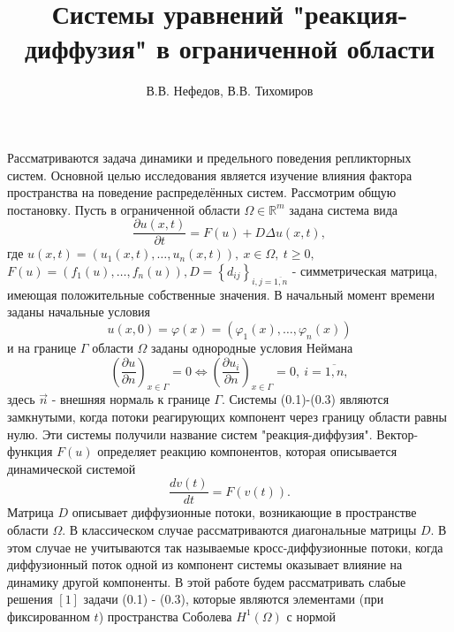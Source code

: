 \documentclass[9pt, a4paper]{extarticle}
\title{Системы уравнений "реакция-диффузия" в ограниченной области}
\author{В.В. Нефедов, В.В. Тихомиров}
\numberwithin{equation}{section}
\numberwithin{lemma}{section}
\numberwithin{definition}{section}
\numberwithin{notabene}{section}
\numberwithin{corollary}{section}
\begin{document}
	\maketitle
	Рассматриваются задача динамики и предельного поведения репликторных систем. Основной целью исследования является изучение влияния фактора пространства на поведение распределённых систем. Рассмотрим общую постановку.\newline
	Пусть в ограниченной области $\Omega \in \mathbb{R}^m$ задана система вида
	\begin{equation}
		\dfrac{\partial u(x,t)}{\partial t} = F(u) + D \Delta u(x,t),
	\end{equation}
	где $u(x,t) = \left(u_1(x,t), \dots, u_n(x,t)\right),\ x \in \Omega, \ t \geq 0,$ \newline $ F(u) = \left(f_1(u), \dots, f_n(u)\right),$\newline $D = \left\{d_{ij}\right\}_{i,j=\overline{1,n}}$ - симметрическая матрица, имеющая положительные собственные значения. \newline
	В начальный момент времени заданы начальные условия
	\begin{equation}
		u(x,0) = \varphi(x) = \left(\varphi_1(x), \dots, \varphi_n(x)\right)
	\end{equation}
	и на границе $\Gamma$ области $\Omega$ заданы однородные условия Неймана
	\begin{equation}
		\left(\dfrac{\partial u}{\partial n}\right)_{x \in \Gamma} = 0 \Leftrightarrow \left(\dfrac{\partial u_i}{\partial n}\right)_{x \in \Gamma} = 0, \ i = \overline{1,n},
	\end{equation}
	здесь $\vec{n}$ -  внешняя нормаль к границе $\Gamma$.\newline
	Системы (0.1)-(0.3) являются замкнутыми, когда потоки реагирующих компонент через границу области равны нулю. Эти системы получили название систем "реакция-диффузия". Вектор-функция $F(u)$ определяет реакцию компонентов, которая описывается динамической системой
	\begin{equation*}
		\dfrac{dv(t)}{dt} = F(v(t)).
	\end{equation*}
	Матрица $D$ описывает диффузионные потоки, возникающие в пространстве области $\Omega$. В классическом случае рассматриваются диагональные матрицы $D$. В этом случае не учитываются так называемые кросс-диффузионные потоки, когда диффузионный поток одной из компонент системы оказывает влияние на динамику другой компоненты. \newline
	В этой работе будем рассматривать слабые решения $[1]$ задачи (0.1) - (0.3), которые являются элементами (при фиксированном $t$) пространства Соболева $H^1(\Omega)$ с нормой
\end{document}
